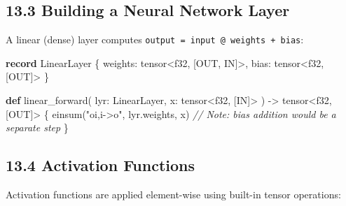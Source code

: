 \documentclass[
  english,
]{book}
\newenvironment{Shaded}{\begin{snugshade}}{\end{snugshade}}
\newcommand{\CommentTok}[1]{\textcolor[rgb]{0.42,0.60,0.33}{\textit{#1}}}
\newcommand{\DataTypeTok}[1]{\textcolor[rgb]{0.31,0.79,0.69}{#1}}
\newcommand{\FunctionTok}[1]{\textcolor[rgb]{0.86,0.86,0.67}{#1}}
\newcommand{\KeywordTok}[1]{\textcolor[rgb]{0.34,0.61,0.84}{\textbf{#1}}}
\newcommand{\NormalTok}[1]{\textcolor[rgb]{0.83,0.83,0.83}{#1}}
\newcommand{\OperatorTok}[1]{\textcolor[rgb]{0.83,0.83,0.83}{#1}}
\newcommand{\StringTok}[1]{\textcolor[rgb]{0.81,0.57,0.47}{#1}}
\begin{document}
\subsection{13.3 Building a Neural Network
Layer}\label{building-a-neural-network-layer}

A linear (dense) layer computes
\texttt{output\ =\ input\ @\ weights\ +\ bias}:

\begin{Shaded}
\begin{Highlighting}[]
\KeywordTok{record}\NormalTok{ LinearLayer \{}
\NormalTok{    weights: }\DataTypeTok{tensor}\OperatorTok{\textless{}}\DataTypeTok{f32}\NormalTok{, [OUT, IN]}\OperatorTok{\textgreater{}}\NormalTok{,}
\NormalTok{    bias: }\DataTypeTok{tensor}\OperatorTok{\textless{}}\DataTypeTok{f32}\NormalTok{, [OUT]}\OperatorTok{\textgreater{}}
\NormalTok{\}}

\KeywordTok{def}\NormalTok{ linear\_forward(}
\NormalTok{    lyr: LinearLayer,}
\NormalTok{    x: }\DataTypeTok{tensor}\OperatorTok{\textless{}}\DataTypeTok{f32}\NormalTok{, [IN]}\OperatorTok{\textgreater{}}
\NormalTok{) }\OperatorTok{{-}\textgreater{}} \DataTypeTok{tensor}\OperatorTok{\textless{}}\DataTypeTok{f32}\NormalTok{, [OUT]}\OperatorTok{\textgreater{}}\NormalTok{ \{}
    \FunctionTok{einsum}\NormalTok{(}\StringTok{"oi,i{-}\textgreater{}o"}\NormalTok{, lyr}\OperatorTok{.}\NormalTok{weights, x)}
    \CommentTok{// Note: bias addition would be a separate step}
\NormalTok{\}}
\end{Highlighting}
\end{Shaded}

\subsection{13.4 Activation Functions}\label{activation-functions}

Activation functions are applied element-wise using built-in tensor
operations:
\end{document}
